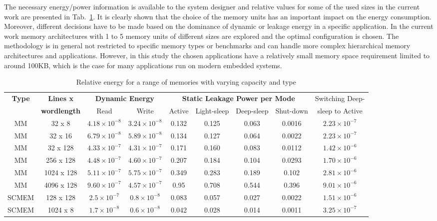 \documentclass[a4paper,conference]{IEEEtran}
\begin{document}
The necessary energy/power information is available to the system designer and relative values for some of the used sizes in the current work are presented in Tab.~\ref{tab:relative}. It is clearly shown that the choice of the memory units has an important impact on the energy consumption. Moreover, different decisions have to be made based on the dominance of dynamic or leakage energy in a specific application. In the current work memory architectures with 1 to 5 memory units  of different sizes are explored and the optimal configuration is chosen. The methodology is in general not restricted to specific memory types or benchmarks and can handle more complex hierarchical memory architectures and applications. However, in this study the chosen applications have a relatively small memory space requirement limited to around 100KB, which is the case for many applications run on modern embedded systems. 
\begin{center}
	\begin{table}[!t]
	\caption{Relative energy for a range of memories with varying capacity and type}
	\label{tab:relative}
	{\small
\hfill{}
	\begin{tabular}{|c|c|c|c|c|c|c|c|c|}
		\hline
		\multirow{2}{*}{\textbf{Type}} & \textbf{Lines x} & \multicolumn{2}{c|}{\textbf{Dynamic Energy}}& \multicolumn{4}{c|}{\textbf{Static Leakage Power per Mode}} & {Switching Deep-} \\ \cline{3-8}
		& \textbf{wordlength} & Read & Write & Active & Light-sleep & Deep-sleep & Shut-down &sleep to Active\\ 
		\hline 
		MM & 32 x 8 &  $ 4.18 \times 10^{-8} $ &  $ 3.24 \times 10^{-8} $ & 0.132 & 0.125 & 0.063 & 0.0016 & $ 2.23 \times 10^{-7} $ \\ 
		\hline
		MM & 32 x 16 & $  6.79 \times 10^{-8} $ &  $ 5.89 \times 10^{-8} $ & 0.134 & 0.127 & 0.064 & 0.0022 & $ 2.23 \times 10^{-7} $ \\ 
		\hline
		MM & 32 x 128 & $  4.33 \times 10^{-7} $ &  $ 4.31 \times 10^{-7} $ & 0.171 & 0.160 & 0.083 & 0.0112 & $ 1.42 \times 10^{-6} $ \\ 
		\hline
		MM & 256 x 128 & $  4.48 \times 10^{-7} $ &  $ 4.60 \times 10^{-7} $ & 0.207 & 0.184 & 0.104 & 0.0293 & $ 1.70 \times 10^{-6} $ \\ 
		\hline
		MM & 1024 x 128 & $  5.11 \times 10^{-7} $ &  $ 5.75 \times 10^{-7} $ & 0.349 & 0.283 & 0.189 & 0.102 & $ 2.81 \times 10^{-6} $ \\ 
		\hline
		MM & 4096 x 128 & $  9.60 \times 10^{-7} $ &  $ 4.57 \times 10^{-7} $ & 0.95 & 0.708 & 0.544 & 0.396 & $ 9.01 \times 10^{-6} $ \\ 
		\hline
		SCMEM & 128 x 128 & $  2.5 \times 10^{-7} $ &  $ 0.8 \times 10^{-8} $ & 0.083 & 0.057 & 0.027 & 0.0022 & $ 1.51 \times 10^{-6} $ \\ 
		\hline
		SCMEM & 1024 x 8 & $  1.7 \times 10^{-8} $ &  $ 0.6 \times 10^{-8} $ & 0.042 &
		 0.028 & 0.014 & 0.0011 & $ 3.25 \times 10^{-7} $ \\ 
		\hline
	\end{tabular}}
	\end{table}
\end{center}
\end{document}
